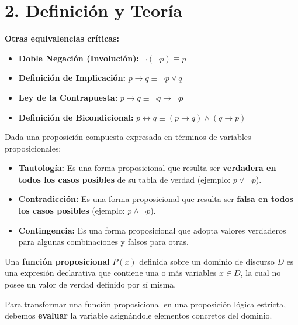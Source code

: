 \documentclass[11pt]{article}
\newenvironment{teoria}{\section*{2. Definición y Teoría}}{}
\newenvironment{definicion}[1]{\begin{tcolorbox}[colback=blue!5,colframe=blue!75!black,title=Definición: #1]}{\end{tcolorbox}}
\newenvironment{teorema}[1]{\begin{tcolorbox}[colback=green!5,colframe=green!75!black,title=Teorema: #1]}{\end{tcolorbox}}
\begin{document}
\begin{teoria}
\begin{teorema}{Leyes del Álgebra Proposicional (Equivalencias Lógicas)}
    \vspace{0.2cm}
    \textbf{Otras equivalencias críticas:}
    \begin{itemize}
        \item \textbf{Doble Negación (Involución):} $\neg(\neg p) \equiv p$
        \item \textbf{Definición de Implicación:} $p \rightarrow q \equiv \neg p \vee q$
        \item \textbf{Ley de la Contrapuesta:} $p \rightarrow q \equiv \neg q \rightarrow \neg p$
        \item \textbf{Definición de Bicondicional:} $p \leftrightarrow q \equiv (p \rightarrow q) \wedge (q \rightarrow p)$
    \end{itemize}
  \end{teorema}

  \begin{teorema}{Clasificación de Formas Proposicionales}
    Dada una proposición compuesta expresada en términos de variables proposicionales:
    \begin{itemize}
      \item \textbf{Tautología:} Es una forma proposicional que resulta ser \textbf{verdadera en todos los casos posibles} de su tabla de verdad (ejemplo: $p \vee \neg p$).
      \item \textbf{Contradicción:} Es una forma proposicional que resulta ser \textbf{falsa en todos los casos posibles} (ejemplo: $p \wedge \neg p$).
      \item \textbf{Contingencia:} Es una forma proposicional que adopta valores verdaderos para algunas combinaciones y falsos para otras.
    \end{itemize}
  \end{teorema}

  \begin{definicion}{Función Proposicional (Predicado)}
    Una \textbf{función proposicional} $P(x)$ definida sobre un dominio de discurso $D$ es una expresión declarativa que contiene una o más variables $x \in D$, la cual no posee un valor de verdad definido por sí misma.
    
    Para transformar una función proposicional en una proposición lógica estricta, debemos \textbf{evaluar} la variable asignándole elementos concretos del dominio.
  \end{definicion}


\end{teoria}
\end{document}
